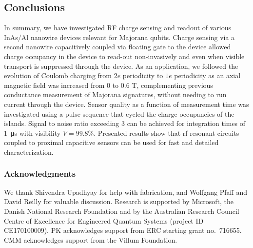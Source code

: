 \subsection{Conclusions}

In summary, we have investigated RF charge sensing and readout of various InAs/Al nanowire devices relevant for Majorana qubits. Charge sensing via a second nanowire capacitively coupled via floating gate to the device allowed charge occupancy in the device to read-out non-invasively and even when visible transport is suppressed through the device. As an application, we followed the evolution of Coulomb charging from $2e$ periodicity to $1e$ periodicity as an axial magnetic field was increased from 0 to 0.6 T, complementing previous conductance measurement of Majorana signatures, without needing to run current through the device. Sensor quality as a function of measurement time was investigated using a pulse sequence that cycled the charge occupancies of the islands. Signal to noise ratio exceeding 3 can be achieved for integration times of \SI{1}{\micro\second} with visibility $V = 99.8\%$. Presented results show that rf resonant circuits coupled to proximal capacitive sensors can be used for fast and detailed characterization.

\subsubsection{Acknowledgments}

We thank Shivendra Upadhyay for help with fabrication, and Wolfgang Pfaff and David Reilly for valuable discussion. Research is supported by Microsoft, the Danish National Research Foundation and by the Australian Research Council Centre of Excellence for Engineered Quantum Systems (project ID CE170100009). PK acknowledges support from ERC starting grant no.~716655. CMM acknowledges support from the Villum Foundation.

